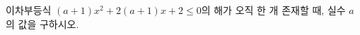 \hspace*{2mm}\begin{minipage}[t]{\dimexpr\linewidth-2mm\relax}\vspace{0pt}
이차부등식 $(a+1)x^2+2(a+1)x+2\le 0$의 해가 오직 한 개 존재할 때, 실수 $a$의 값을 구하시오.\end{minipage}
